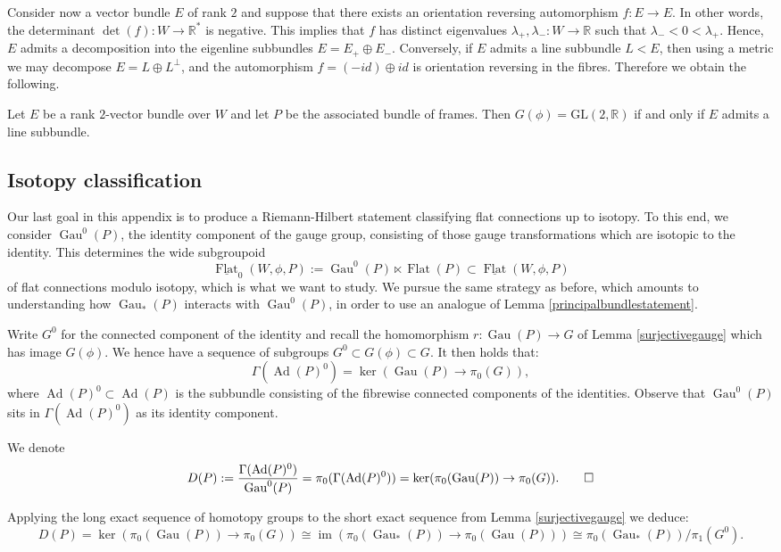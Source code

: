 \documentclass[10pt]{amsart}
\newcommand{\im}{\operatorname{im}}
\newcommand{\FlatCat}{{\underline{\operatorname{Flat}}}}
\newcommand{\FlatObj}{{\operatorname{Flat}}}
\DeclareMathOperator{\Gau}{Gau}
\DeclareMathOperator{\Ad}{Ad}
\numberwithin{theoremalpha}{section}
\numberwithin{equation}{section}
\numberwithin{definition}{section}
\numberwithin{theorem}{section}
\numberwithin{proposition}{section}
\numberwithin{lemma}{section}
\numberwithin{example}{section}
\numberwithin{remark}{section}
\numberwithin{corollary}{section}
\numberwithin{question}{section}
\numberwithin{problem}{section}
\numberwithin{assumption}{section}
\theoremstyle{named}
\numberwithin{equation}{section}
\begin{document}
Consider now a vector bundle $E$ of rank $2$ and suppose that there exists an orientation reversing automorphism $f : E \to E$. In other words, the determinant $\det(f) : W \to \mathbb{R}^{*}$ is negative. This implies that $f$ has distinct eigenvalues $\lambda_{+}, \lambda_{-} : W \to \mathbb{R}$ such that $\lambda_{-} < 0 < \lambda_{+}$. Hence, $E$ admits a decomposition into the eigenline subbundles $E = E_{+} \oplus E_{-}$. Conversely, if $E$ admits a line subbundle $L < E$, then using a metric we may decompose $E = L \oplus L^{\perp}$, and the automorphism $f = (-id) \oplus id$ is orientation reversing in the fibres. Therefore we obtain the following. 
\begin{corollary}\label{evenn}
Let $E$ be a rank $2$-vector bundle over $W$ and let $P$ be the associated bundle of frames. Then $G(\phi)  = \mathrm{GL}(2, \mathbb{R})$ if and only if $E$ admits a line subbundle. 
\end{corollary}




\subsection{Isotopy classification} \label{isotopyRH}

Our last goal in this appendix is to produce a Riemann-Hilbert statement classifying flat connections up to isotopy. To this end, we consider $\Gau^{0}(P)$, the identity component of the gauge group, consisting of those gauge transformations which are isotopic to the identity. This determines the wide subgroupoid 
\[ \FlatCat_{0}(W, \phi, P) := \Gau^{0}(P) \ltimes \FlatObj(P) \subset \FlatCat(W, \phi, P) \]
of flat connections modulo isotopy, which is what we want to study. We pursue the same strategy as before, which amounts to understanding how $\Gau_{*}(P)$ interacts with $\Gau^0(P)$, in order to use an analogue of Lemma \ref{principalbundlestatement}.

Write $G^0$ for the connected component of the identity and recall the homomorphism $r: \Gau(P) \to G$ of Lemma \ref{surjectivegauge} which has image $G(\phi)$. We hence have a sequence of subgroups $G^0 \subset G(\phi) \subset G$. It then holds that:
\[ \Gamma(\Ad(P)^0) = \ker(\Gau(P) \rightarrow \pi_0(G)), \]
where $\Ad(P)^0 \subset \Ad(P)$ is the subbundle consisting of the fibrewise connected components of the identities. Observe that $\Gau^0(P)$ sits in $\Gamma(\Ad(P)^0)$ as its identity component.
\begin{definition}
We denote
\[ D(P) := \dfrac{\Gamma(\Ad(P)^0)}{\Gau^0(P)} = \pi_0(\Gamma(\Ad(P)^0)) = \ker(\pi_0(\Gau(P)) \rightarrow \pi_0(G)). \qedhere \]
\end{definition}
Applying the long exact sequence of homotopy groups to the short exact sequence from Lemma \ref{surjectivegauge} we deduce:
\[  D(P) = \ker(\pi_0(\Gau(P)) \rightarrow \pi_0(G)) \cong \im(\pi_0(\Gau_*(P)) \rightarrow \pi_0(\Gau(P))) \cong \pi_0(\Gau_*(P))/\pi_1(G^0). \]
\end{document}
